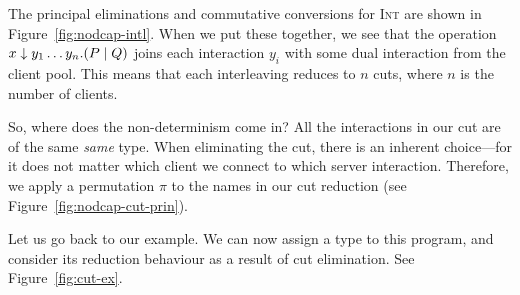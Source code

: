 \documentclass[a4paper,UKenglish]{lipics-v2016}
\begin{document}
The principal eliminations and commutative conversions for \textsc{Int} are
shown in Figure~\ref{fig:nodcap-intl}. When we put these together, we see that
the operation ${x \downarrow y_1 \dots y_n.}(P \mid Q)$ joins each interaction $y_i$
with some dual interaction from the client pool. This means that each
interleaving reduces to $n$ cuts, where $n$ is the number of clients.
%


So, where does the non-determinism come in? All the interactions in our cut are
of the same \emph{same} type. When eliminating the cut, there is an inherent
choice---for it does not matter which client we connect to which server
interaction. Therefore, we apply a permutation $\pi$ to the names in our cut
reduction (see Figure~\ref{fig:nodcap-cut-prin}).

Let us go back to our example. We can now assign a type to this program, and
consider its reduction behaviour as a result of cut elimination. See
Figure~\ref{fig:cut-ex}.
%

\end{document}
